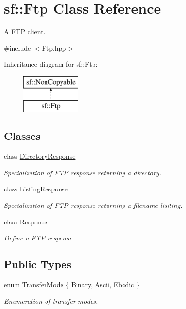 \hypertarget{classsf_1_1Ftp}{\section{sf\-:\-:Ftp Class Reference}
\label{classsf_1_1Ftp}
}


A F\-T\-P client.  




{\ttfamily \#include $<$Ftp.\-hpp$>$}

Inheritance diagram for sf\-:\-:Ftp\-:\begin{figure}[H]
\begin{center}
\leavevmode
\includegraphics[height=2.000000cm]{classsf_1_1Ftp}
\end{center}
\end{figure}
\subsection*{Classes}
\begin{DoxyCompactItemize}
\item 
class \hyperlink{classsf_1_1Ftp_1_1DirectoryResponse}{Directory\-Response}
\begin{DoxyCompactList}\small\item\em Specialization of F\-T\-P response returning a directory. \end{DoxyCompactList}\item 
class \hyperlink{classsf_1_1Ftp_1_1ListingResponse}{Listing\-Response}
\begin{DoxyCompactList}\small\item\em Specialization of F\-T\-P response returning a filename lisiting. \end{DoxyCompactList}\item 
class \hyperlink{classsf_1_1Ftp_1_1Response}{Response}
\begin{DoxyCompactList}\small\item\em Define a F\-T\-P response. \end{DoxyCompactList}\end{DoxyCompactItemize}
\subsection*{Public Types}
\begin{DoxyCompactItemize}
\item 
enum \hyperlink{classsf_1_1Ftp_a1cd6b89ad23253f6d97e6d4ca4d558cb}{Transfer\-Mode} \{ \hyperlink{classsf_1_1Ftp_a1cd6b89ad23253f6d97e6d4ca4d558cba6f253b362639fb5e059dc292762a21ee}{Binary}, 
\hyperlink{classsf_1_1Ftp_a1cd6b89ad23253f6d97e6d4ca4d558cbac9e544a22dce8ef3177449cb235d15c2}{Ascii}, 
\hyperlink{classsf_1_1Ftp_a1cd6b89ad23253f6d97e6d4ca4d558cbabb1e34435231e73c96534c71090be7f4}{Ebcdic}
 \}
\begin{DoxyCompactList}\small\item\em Enumeration of transfer modes. \end{DoxyCompactList}\end{DoxyCompactItemize}
